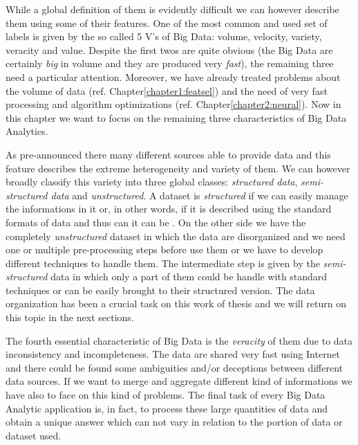 \documentclass{standalone}
\begin{document}
While a global definition of them is evidently difficult we can however describe them using some of their  features.
One of the most common and used set of labels is given by the so called 5 V's of Big Data: volume, velocity, variety, veracity and value.
Despite the first twos are quite obvious (the Big Data are certainly \emph{big} in volume and they are produced very \emph{fast}), the remaining three need a particular attention.
Moreover, we have already treated problems about the volume of data (ref. Chapter\ref{chapter1:featsel}) and the need of very fast processing and algorithm optimizations (ref. Chapter\ref{chapter2:neural}).
Now in this chapter we want to focus on the remaining three characteristics of Big Data Analytics.

As pre-announced there many different sources able to provide data and this feature describes the extreme heterogeneity and variety of them.
We can however broadly classify this variety into three global classes: \emph{structured data}, \emph{semi-structured data} and \emph{unstructured}.
A dataset is \emph{structured} if we can easily manage the informations in it or, in other words, if it is described using the standard formats of data and thus can it can be .
On the other side we have the completely \emph{unstructured} dataset in which the data are disorganized and we need one or multiple pre-processing steps before use them or we have to develop different techniques to handle them.
The intermediate step is given by the \emph{semi-structured} data in which only a part of them could be handle with standard techniques or can be easily brought to their structured version.
The data organization has been a crucial task on this work of thesis and we will return on this topic in the next sections.

The fourth essential characteristic of Big Data is the \emph{veracity} of them due to data inconsistency and incompleteness.
The data are shared very fast using Internet and there could be found some ambiguities and/or deceptions between different data sources.
If we want to merge and aggregate different kind of informations we have also to face on this kind of problems.
The final task of every Big Data Analytic application is, in fact, to process these large quantities of data and obtain a unique answer which can not vary in relation to the portion of data or dataset used.
\end{document}
